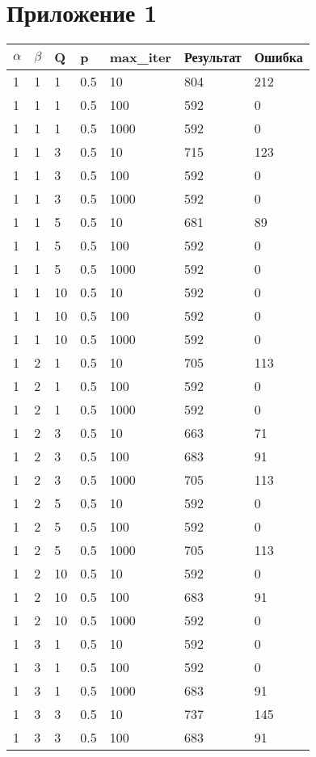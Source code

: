 \newpage
\chapter*{Приложение 1}
\FloatBarrier
\begin{longtable}{ | l | l | l | l | l | l | l |}
	\hline
	$\alpha$ & $\beta$ & Q & p & max\_iter & Результат & Ошибка \\ 
	\hline
	1 & 1 & 1 & 0.5 & 10 & 804 & 212 \\ 
	1 & 1 & 1 & 0.5 & 100 & 592 & 0 \\ 
	1 & 1 & 1 & 0.5 & 1000 & 592 & 0 \\ 
	1 & 1 & 3 & 0.5 & 10 & 715 & 123 \\ 
	1 & 1 & 3 & 0.5 & 100 & 592 & 0 \\
	1 & 1 & 3 & 0.5 & 1000 & 592 & 0 \\
	1 & 1 & 5 & 0.5 & 10 & 681 & 89 \\ 
	1 & 1 & 5 & 0.5 & 100 & 592 & 0 \\ 
	1 & 1 & 5 & 0.5 & 1000 & 592 & 0 \\ 
	1 & 1 & 10 & 0.5 & 10 & 592 & 0 \\ 
	1 & 1 & 10 & 0.5 & 100 & 592 & 0 \\ 
	1 & 1 & 10 & 0.5 & 1000 & 592 & 0 \\ 
	1 & 2 & 1 & 0.5 & 10 & 705 & 113 \\ 
	1 & 2 & 1 & 0.5 & 100 & 592 & 0 \\ 
	1 & 2 & 1 & 0.5 & 1000 & 592 & 0 \\ 
	1 & 2 & 3 & 0.5 & 10 & 663 & 71 \\ 
	1 & 2 & 3 & 0.5 & 100 & 683 & 91 \\ 
	1 & 2 & 3 & 0.5 & 1000 & 705 & 113 \\ 
	1 & 2 & 5 & 0.5 & 10 & 592 & 0 \\ 
	1 & 2 & 5 & 0.5 & 100 & 592 & 0 \\ 
	1 & 2 & 5 & 0.5 & 1000 & 705 & 113 \\ 
	1 & 2 & 10 & 0.5 & 10 & 592 & 0 \\ 
	1 & 2 & 10 & 0.5 & 100 & 683 & 91 \\ 
	1 & 2 & 10 & 0.5 & 1000 & 592 & 0 \\ 
	1 & 3 & 1 & 0.5 & 10 & 592 & 0 \\ 
	1 & 3 & 1 & 0.5 & 100 & 592 & 0 \\ 
	1 & 3 & 1 & 0.5 & 1000 & 683 & 91 \\ 
	1 & 3 & 3 & 0.5 & 10 & 737 & 145 \\ 
	1 & 3 & 3 & 0.5 & 100 & 683 & 91 \\ 

\end{longtable}

